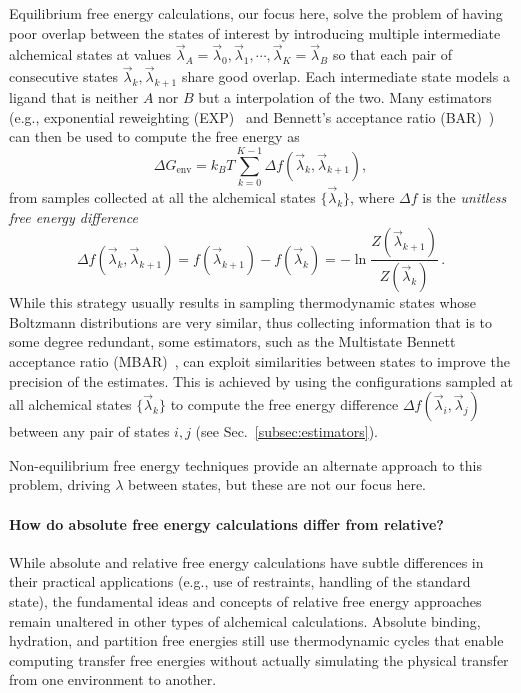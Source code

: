 \documentclass[9pt,bestpractices,pubversion]{livecoms}
\begin{document}
Equilibrium free energy calculations, our focus here, solve the problem of having poor overlap between the states of interest by introducing multiple intermediate alchemical states at values $\vec{\lambda}_A = \vec{\lambda}_0, \vec{\lambda}_1, \cdots, \vec{\lambda}_K = \vec{\lambda}_B$ so that each pair of consecutive states $\vec{\lambda}_k, \vec{\lambda}_{k+1}$ share good overlap.
Each intermediate state models a ligand that is neither $A$ nor $B$ but a interpolation of the two.
Many estimators (e.g., exponential reweighting (EXP)~\cite{zwanzig1954hightemperature} and Bennett's acceptance ratio (BAR)~\cite{bennett1976efficient,shirts2003equilibrium}) can then be used to compute the free energy as
\begin{equation}
    \Delta G_{\mathrm{env}} = k_BT \sum_{k=0}^{K-1} \Delta f(\vec{\lambda}_k, \vec{\lambda}_{k+1}),
\end{equation}
from samples collected at all the alchemical states $\{\vec{\lambda}_k \}$, where $\Delta f$ is the \emph{unitless free energy difference}
\begin{equation}
    \Delta f(\vec{\lambda}_k, \vec{\lambda}_{k+1}) = f(\vec{\lambda}_{k+1}) - f(\vec{\lambda}_k) = - \ln \frac{Z(\vec{\lambda}_{k+1})}{Z(\vec{\lambda}_k)} \, .
\end{equation}
While this strategy usually results in sampling thermodynamic states whose Boltzmann distributions are very similar, thus collecting information that is to some degree redundant, some estimators, such as the Multistate Bennett acceptance ratio (MBAR)~\cite{shirts2008statisticallya}, can exploit similarities between states to improve the precision of the estimates. This is achieved by using the configurations sampled at all alchemical states $\{\vec{\lambda}_k \}$ to compute the free energy difference $\Delta f(\vec{\lambda}_i, \vec{\lambda}_{j})$ between any pair of states $i,j$ (see Sec.~\ref{subsec:estimators}).

Non-equilibrium free energy techniques provide an alternate approach to this problem, driving $\lambda$ between states, but these are not our focus here.~\cite{jarzynski1997nonequilibrium,jarzynski1998equilibrium,crooks2000pathensemble, gapsys2020large}

\paragraph{How do absolute free energy calculations differ from relative?}

While absolute and relative free energy calculations have subtle differences in their practical applications (e.g., use of restraints, handling of the standard state), the fundamental ideas and concepts of relative free energy approaches remain unaltered in other types of alchemical calculations.
Absolute binding, hydration, and partition free energies still use thermodynamic cycles that enable computing transfer free energies without actually simulating the physical transfer from one environment to another.
\end{document}
